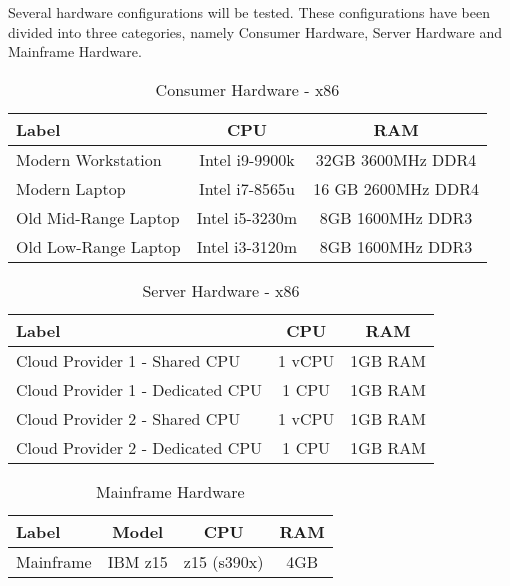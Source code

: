 Several hardware configurations will be tested. These configurations have been divided into three categories, namely Consumer Hardware, Server Hardware and Mainframe Hardware.

\begin{table}[H]
    \centering
    \begin{tabular}{l|c|c}
        Label & CPU & RAM\\
        \hline
        Modern Workstation & Intel i9-9900k & 32GB 3600MHz DDR4\\
        Modern Laptop & Intel i7-8565u & 16 GB 2600MHz DDR4\\
        Old Mid-Range Laptop & Intel i5-3230m & 8GB 1600MHz DDR3\\
        Old Low-Range Laptop & Intel i3-3120m & 8GB 1600MHz DDR3
    \end{tabular}
    \caption{Consumer Hardware - x86}
    \label{table:method:consumer-hardware}
\end{table}

\begin{table}[H]
    \centering
    \begin{tabular}{l|c|c}
        Label & CPU & RAM\\
        \hline
        Cloud Provider 1 - Shared CPU\footnotemark & 1 vCPU & 1GB RAM \\
        Cloud Provider 1 - Dedicated CPU\footnotemark & 1 CPU & 1GB RAM \\
        Cloud Provider 2 - Shared CPU\footnotemark & 1 vCPU & 1GB RAM \\
        Cloud Provider 2 - Dedicated CPU\footnotemark & 1 CPU & 1GB RAM \\
    \end{tabular}
    \caption{Server Hardware - x86}
    \label{table:method:server-hardware}
\end{table}
\addtocounter{footnote}{-4}
\addtocounter{footnote}{1}
\addtocounter{footnote}{1}
\addtocounter{footnote}{1}
\addtocounter{footnote}{1}

\begin{table}[H]
    \centering
    \begin{tabular}{l|c|c|c}
        Label & Model & CPU & RAM\\
        \hline
        Mainframe & IBM z15 & z15 (s390x) & 4GB\\
    \end{tabular}
    \caption{Mainframe Hardware}
    \label{table:method:mainframe-hardware}
\end{table}

